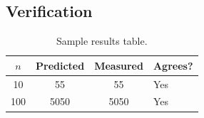 \subsection{Verification}
\begin{table}[H]
\centering
\caption{Sample results table.}
\vspace{4pt}
\begin{tabularx}{\textwidth}{c c c X}
\toprule
$n$ & \textbf{Predicted} & \textbf{Measured} & \textbf{Agrees?}\\
\midrule
10 & 55 & 55 & Yes\\
100 & 5050 & 5050 & Yes\\
\bottomrule
\end{tabularx}
\end{table}
